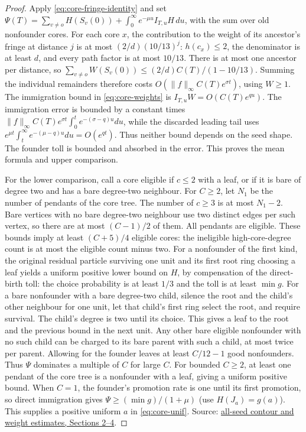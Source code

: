 \documentclass[11pt]{article}
\newcommand{\proofsrc}[2]{\href{https://github.com/uzay-eth/friend-tree-exponent/blob/a0972085ad72ad5685ae7b424988648d1965e73c/#1}{#2}}
\theoremstyle{remark}
\numberwithin{equation}{section}
\begin{document}
\begin{proof}
Apply \eqref{eq:core-fringe-identity} and set $\Psi(T)=\sum_{v\ne o}H(S_v(0))+\int_0^\infty e^{-\mu u}I_{T,u}H\,du$, with the sum over old nonfounder cores. For each core $x$, the contribution to the weight of its ancestor's fringe at distance $j$ is at most $(2/d)(10/13)^j$: $h(c_x)\le2$, the denominator is at least $d$, and every path factor is at most $10/13$. There is at most one ancestor per distance, so $\sum_{v\ne o}W(S_v(0))\le (2/d)C(T)/(1-10/13)$. Summing the individual remainders therefore costs $O(\|f\|_\infty C(T)e^{\sigma t})$, using $W\ge1$. The immigration bound in \eqref{eq:core-weights} is $I_{T,u}W=O(C(T)e^{qu})$. The immigration error is bounded by a constant times $\|f\|_\infty C(T)e^{\sigma t}\int_0^t e^{-(\sigma-q)u}du$, while the discarded leading tail uses $e^{\mu t}\int_t^\infty e^{-(\mu-q)u}du=O(e^{qt})$. Thus neither bound depends on the seed shape. The founder toll is bounded and absorbed in the error. This proves the mean formula and upper comparison.

For the lower comparison, call a core eligible if $c\le2$ with a leaf, or if it is bare of degree two and has a bare degree-two neighbour. For $C\ge2$, let $N_1$ be the number of pendants of the core tree. The number of $c\ge3$ is at most $N_1-2$. Bare vertices with no bare degree-two neighbour use two distinct edges per such vertex, so there are at most $(C-1)/2$ of them. All pendants are eligible. These bounds imply at least $(C+5)/4$ eligible cores: the ineligible high-core-degree count is at most the eligible count minus two. For a nonfounder of the first kind, the original residual particle surviving one unit and its first root ring choosing a leaf yields a uniform positive lower bound on $H$, by compensation of the direct-birth toll: the choice probability is at least $1/3$ and the toll is at least $\min g$. For a bare nonfounder with a bare degree-two child, silence the root and the child's other neighbour for one unit, let that child's first ring select the root, and require survival. The child's degree is two until its choice. This gives a leaf to the root and the previous bound in the next unit. Any other bare eligible nonfounder with no such child can be charged to its bare parent with such a child, at most twice per parent. Allowing for the founder leaves at least $C/12-1$ good nonfounders. Thus $\Psi$ dominates a multiple of $C$ for large $C$. For bounded $C\ge2$, at least one pendant of the core tree is a nonfounder with a leaf, giving a uniform positive bound. When $C=1$, the founder's promotion rate is one until its first promotion, so direct immigration gives $\Psi\ge(\min g)/(1+\mu)$ (use $H(J_a)=g(a)$). This supplies a positive uniform $a$ in \eqref{eq:core-unif}. Source: \proofsrc{round2/proofs/astra/source/round2/standalone/claim-6.md}{all-seed contour and weight estimates, Sections 2--4}.
\end{proof}
\end{document}
